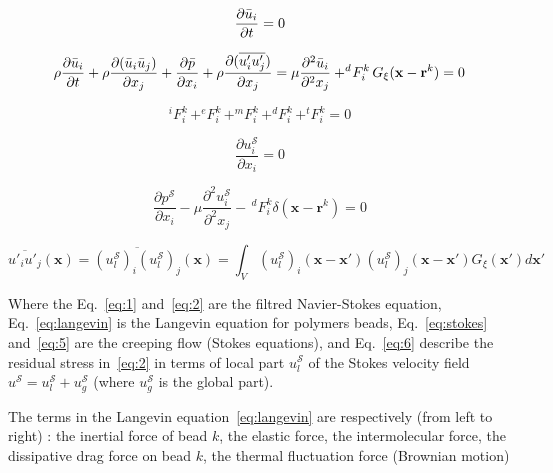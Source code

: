 \begin{equation}
 \frac{\partial \bar{u}_i}{\partial t} = 0  \\
 \label{eq:1}
\end{equation}

\begin{equation}
   \rho  \frac{\partial \bar{u}_i}{\partial t} + \rho \frac{\partial (\bar{u}_i \bar{u}_j) }{\partial x_j}+\frac{\partial\bar{p}}{\partial x_i} + \rho \frac{\partial (\overline{u'_i u'_j})}{\partial x_j} 
= \mu \frac{\partial^2 \bar{u}_i}{\partial^2 x_j } + ^d\!F_i^k \, G_{\xi} (\mathbf{x}-\mathbf{r}^k) = 0\\
  \label{eq:2}
\end{equation}

\begin{equation}
  ^i\!F_i^k \, + ^e\!F_i^k \, + ^m\!F_i^k \, + ^d\!F_i^k \,+ ^t\!F_i^k = 0
\label{eq:langevin}
\end{equation}

\begin{equation}
    \frac{\partial u_i^\mathcal{S}}{\partial x_i} = 0
 \label{eq:stokes}   
\end{equation}

\begin{equation}
\frac{\partial p^{\mathcal{S}}}{\partial x_i} - \mu \frac{\partial^2 u_i^{\mathcal{S}}}{\partial^2 x_j} - \, ^d\!F_i^k \delta(\mathbf{x} -\mathbf{r}^k) = 0
\label{eq:5}
\end{equation}

\begin{equation}
\overline{u'_i u'_j}(\mathbf{x}) = \overline{(u_l^{\mathcal{S}})_i 
(u_l^{\mathcal{S}})_j }(\mathbf{x}) = \int_V (u_l^{\mathcal{S}})_i
(\mathbf{x-x'}) (u_l^{\mathcal{S}})_j (\mathbf{x-x'})G_\xi (\mathbf{x'})d\mathbf{x'}
\label{eq:6}
\end{equation}
\vspace{0.5cm}

Where the Eq.~\ref{eq:1} and~\ref{eq:2} are the filtred Navier-Stokes
equation, Eq.~\ref{eq:langevin} is the Langevin equation for polymers beads, Eq.~\ref{eq:stokes} and~\ref{eq:5} are the creeping flow (Stokes equations), and Eq.~\ref{eq:6} describe the residual stress in~\ref{eq:2} in terms of local part $u_l^\mathcal{S}$
of the Stokes velocity field $u^{\mathcal{S}} =  u_l^\mathcal{S} + u_g^\mathcal{S}$ (where $u_g^\mathcal{S}$ is the global part).

The terms in the Langevin equation~\ref{eq:langevin} are respectively (from left to right) : the inertial force of bead $k$, the elastic force, the intermolecular force, the dissipative drag force on bead $k$,  the thermal fluctuation force (Brownian motion)  

